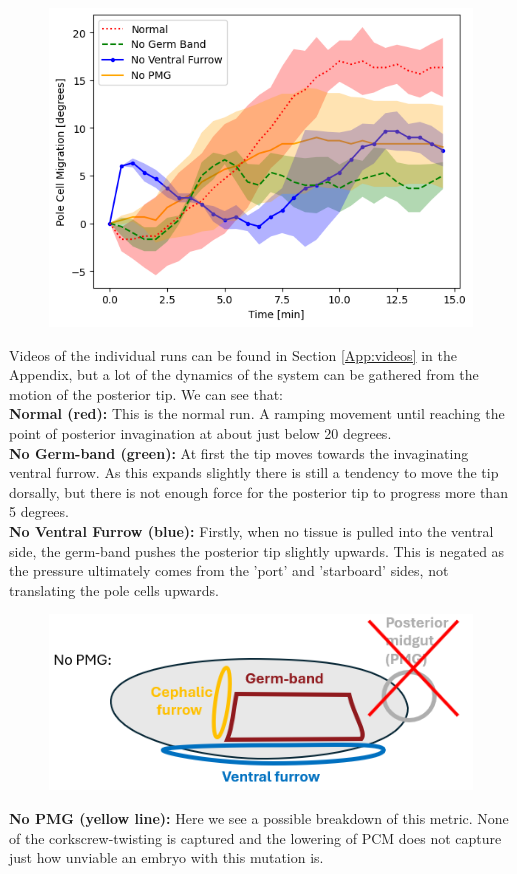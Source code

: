 \begin{figure}[H]
    \centering
    \includegraphics[width=1.\linewidth]{chapters/Results/figures/compare_PCM.png}
    \caption{}
    \label{fig:PCM-mutants}
\end{figure}


Videos of the individual runs can be found in Section \ref{App:videos} in the Appendix, but a lot of the dynamics of the system can be gathered from the motion of the posterior tip. We can see that:\\
\textbf{Normal (red):} This is the normal run. A ramping movement until reaching the point of posterior invagination at about just below 20 degrees. \\
\textbf{No Germ-band (green):} At first the tip moves towards the invaginating ventral furrow. As this expands slightly there is still a tendency to move the tip dorsally, but there is not enough force for the posterior tip to progress more than 5 degrees. \\
\textbf{No Ventral Furrow (blue):} Firstly, when no tissue is pulled into the ventral side, the germ-band pushes the posterior tip slightly upwards. This is negated as the pressure ultimately comes from the 'port' and 'starboard' sides, not translating the pole cells upwards.\\
\begin{figure}
    \centering
    \hspace{-3cm}
    \includegraphics[width=0.5\linewidth]{chapters//Results/no_pmg_mutant_schematic.png}
\end{figure}
\textbf{No PMG (yellow line):} Here we see a possible breakdown of this metric. None of the corkscrew-twisting is captured and the lowering of PCM does not capture just how unviable an embryo with this mutation is.  


